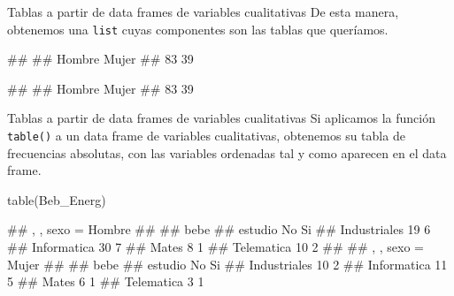\documentclass[
  ignorenonframetext,
  aspectratio=169]{beamer}
\newenvironment{Shaded}{\begin{snugshade}}{\end{snugshade}}
\newcommand{\AttributeTok}[1]{\textcolor[rgb]{0.77,0.63,0.00}{#1}}
\newcommand{\DecValTok}[1]{\textcolor[rgb]{0.00,0.00,0.81}{#1}}
\newcommand{\FunctionTok}[1]{\textcolor[rgb]{0.00,0.00,0.00}{#1}}
\newcommand{\NormalTok}[1]{#1}
\newcommand{\SpecialCharTok}[1]{\textcolor[rgb]{0.00,0.00,0.00}{#1}}
\let\oldverbatim\verbatim
\let\endoldverbatim\endverbatim
\renewenvironment{verbatim}{\tiny\oldverbatim}{\endoldverbatim}
\begin{document}
\begin{frame}[fragile]{Tablas a partir de data frames de variables
cualitativas}
\protect\hypertarget{tablas-a-partir-de-data-frames-de-variables-cualitativas-6}{}
De esta manera, obtenemos una \texttt{list} cuyas componentes son las
tablas que queríamos.

\begin{Shaded}
\end{Shaded}

\begin{verbatim}
## 
## Hombre  Mujer 
##     83     39
\end{verbatim}

\begin{Shaded}
\end{Shaded}

\begin{verbatim}
## 
## Hombre  Mujer 
##     83     39
\end{verbatim}
\end{frame}

\begin{frame}[fragile]{Tablas a partir de data frames de variables
cualitativas}
\protect\hypertarget{tablas-a-partir-de-data-frames-de-variables-cualitativas-7}{}
Si aplicamos la función \texttt{table()} a un data frame de variables
cualitativas, obtenemos su tabla de frecuencias absolutas, con las
variables ordenadas tal y como aparecen en el data frame.

\begin{Shaded}
\begin{Highlighting}[]
\FunctionTok{table}\NormalTok{(Beb\_Energ)}
\end{Highlighting}
\end{Shaded}

\begin{verbatim}
## , , sexo = Hombre
## 
##               bebe
## estudio        No Si
##   Industriales 19  6
##   Informatica  30  7
##   Mates         8  1
##   Telematica   10  2
## 
## , , sexo = Mujer
## 
##               bebe
## estudio        No Si
##   Industriales 10  2
##   Informatica  11  5
##   Mates         6  1
##   Telematica    3  1
\end{verbatim}
\end{frame}
\end{document}
